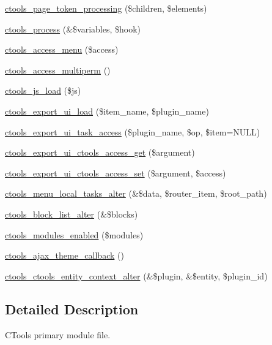 \begin{DoxyCompactItemize}
\item 
\hyperlink{ctools_8module_ada3893e7993e19022048e2b47b413baa}{ctools\_\-page\_\-token\_\-processing} (\$children, \$elements)
\item 
\hyperlink{ctools_8module_a2f9ba929f2bd627113c551823ac43afc}{ctools\_\-process} (\&\$variables, \$hook)
\item 
\hyperlink{ctools_8module_ae5b8ef5c7720e6aee33ff8e15d8dacbd}{ctools\_\-access\_\-menu} (\$access)
\item 
\hyperlink{ctools_8module_a5fa148b37edfc92192dcf6eb22299d5c}{ctools\_\-access\_\-multiperm} ()
\item 
\hyperlink{ctools_8module_a5d07b6c831cc85a1bde277a817d3675d}{ctools\_\-js\_\-load} (\$js)
\item 
\hyperlink{ctools_8module_a9aa80761de735e1b6d9d1fbac0da04ad}{ctools\_\-export\_\-ui\_\-load} (\$item\_\-name, \$plugin\_\-name)
\item 
\hyperlink{ctools_8module_a5e2e7c8a0fb252f056d980a6d6cc1e53}{ctools\_\-export\_\-ui\_\-task\_\-access} (\$plugin\_\-name, \$op, \$item=NULL)
\item 
\hyperlink{ctools_8module_a60ede52adc0e36252c48a28946187ca9}{ctools\_\-export\_\-ui\_\-ctools\_\-access\_\-get} (\$argument)
\item 
\hyperlink{ctools_8module_a816f35c4e895c69befa4afd787324880}{ctools\_\-export\_\-ui\_\-ctools\_\-access\_\-set} (\$argument, \$access)
\item 
\hyperlink{ctools_8module_a943750c628ffe3a20ece880e15a34240}{ctools\_\-menu\_\-local\_\-tasks\_\-alter} (\&\$data, \$router\_\-item, \$root\_\-path)
\item 
\hyperlink{ctools_8module_a75e6c439d7246bcab69763c612716c90}{ctools\_\-block\_\-list\_\-alter} (\&\$blocks)
\item 
\hyperlink{ctools_8module_aaad6f0b6ff8fd26cc15837b2f9620c98}{ctools\_\-modules\_\-enabled} (\$modules)
\item 
\hyperlink{ctools_8module_a270062e67835dc99cc4b57fba5f06289}{ctools\_\-ajax\_\-theme\_\-callback} ()
\item 
\hyperlink{ctools_8module_aa0eddd96e485a58f4259351b9f9cb918}{ctools\_\-ctools\_\-entity\_\-context\_\-alter} (\&\$plugin, \&\$entity, \$plugin\_\-id)
\end{DoxyCompactItemize}


\subsection{Detailed Description}
CTools primary module file.

